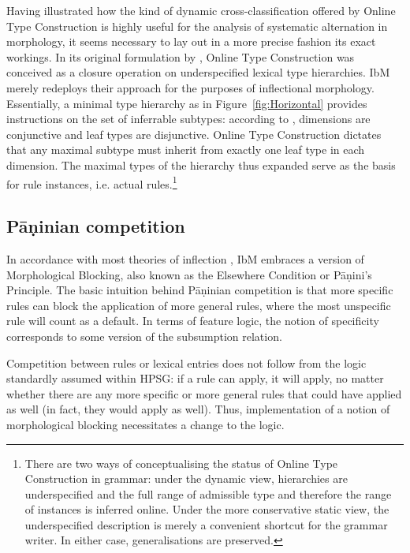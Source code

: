 \documentclass[output=paper
	        ,collection
	        ,collectionchapter
 	        ,biblatex
                ,babelshorthands
                ,newtxmath
                ,draftmode
                ,colorlinks, citecolor=brown
]{langscibook}
\begin{document}
\begin{exe}
\begin{xlist}
\begin{exe}
\begin{xlist}
Having illustrated how the kind of dynamic cross-classification
offered by Online Type Construction is highly useful for the analysis
of systematic alternation in morphology, it seems necessary to lay out
in a more precise fashion its exact workings. In its original
formulation by \citet{Koenig94,Koenig99}, Online Type Construction was conceived as a
closure operation on underspecified lexical type hierarchies. IbM
merely redeploys their approach for the purposes of inflectional
morphology. Essentially, a minimal type hierarchy as in
Figure~\ref{fig:Horizontal} provides instructions on the set of
inferrable subtypes: according to \citet{Koenig94}, dimensions are
conjunctive and leaf types are disjunctive. Online Type Construction
dictates that any maximal subtype must inherit from exactly one leaf
type in each dimension. The maximal types of the hierarchy thus
expanded serve as the basis for rule instances, i.e. actual
rules.\footnote{\label{fn:OTC}There are two ways of conceptualising the status of
  Online Type Construction in grammar: under the dynamic view, hierarchies are
  underspecified and the full range of admissible type and therefore
  the range of instances is inferred online. Under the more
  conservative static view, the underspecified description is merely a
  convenient shortcut for the grammar writer. In either case,
  generalisations are preserved.   
   }



\subsection{Pāṇinian competition}
\label{sec:Panini}

In accordance with most theories of inflection
\citep{Prince93,Stump01,Anderson92,Noyer92,kiparsky_p85}, IbM embraces
a version of Morphological Blocking, also known as the Elsewhere Condition
\citep{kiparsky_p85} or Pāṇini's Principle. The basic intuition behind
Pāṇinian competition is that more specific rules can block the
application of more general rules, where the most unspecific rule will
count as a default. In terms of feature logic, the notion of
specificity corresponds to some version of the subsumption relation.

Competition between rules or lexical entries does not follow from the
logic standardly assumed within HPSG: if a rule can apply, it will
apply, no matter whether there are any more specific or more general
rules that could have applied as well (in fact, they would apply as
well). Thus, implementation of a notion of morphological blocking
necessitates a change to the logic.


\end{xlist}
\end{exe}
\end{xlist}
\end{exe}
\end{document}
